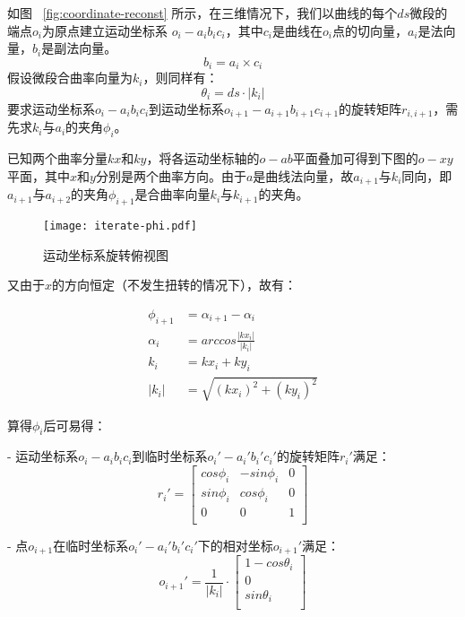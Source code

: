 如图 ~\ref{fig:coordinate-reconst} 所示，在三维情况下，我们以曲线的每个$ds$微段的端点$o_i$为原点建立运动坐标系\cite{three-dimensional-curve} $o_i-a_ib_ic_i$，其中$c_i$是曲线在$o_i$点的切向量，$a_i$是法向量，$b_i$是副法向量。
\begin{equation}
b_i = a_i \times c_i
\end{equation}
假设微段合曲率向量为$k_i$，则同样有：
\begin{equation}
\theta_i = ds\cdot |k_i|
\end{equation}
要求运动坐标系$o_i-a_ib_ic_i$到运动坐标系$o_{i+1}-a_{i+1}b_{i+1}c_{i+1}$的旋转矩阵$r_{i, i+1}$，需先求$k_i$与$a_i$的夹角$\phi_i$。

已知两个曲率分量$kx$和$ky$，将各运动坐标轴的$o-ab$平面叠加可得到下图的$o-xy$平面，其中$x$和$y$分别是两个曲率方向。由于$a$是曲线法向量，故$a_{i+1}$与$k_i$同向，即$a_{i+1}$与$a_{i+2}$的夹角$\phi_{i+1}$是合曲率向量$k_i$与$k_{i+1}$的夹角。

\begin{figure}
\centering
\texttt{[image: iterate-phi.pdf]}
\caption{运动坐标系旋转俯视图}
\label{fig:iterate-phi} 
\end{figure}

又由于$x$的方向恒定（不发生扭转的情况下），故有：

\begin{align}
\phi_{i+1} &= \alpha_{i+1} - \alpha_i \\
\alpha_i &= arccos\frac{|kx_i|}{|k_i|} \\
k_i &= kx_i + ky_i \\
|k_i| &= \sqrt{(kx_i)^2 + (ky_i)^2}
\end{align}

算得$\phi_i$后可易得：

- 运动坐标系$o_i-a_ib_ic_i$到临时坐标系$o_i'-a_i'b_i'c_i'$的旋转矩阵$r_i'$满足：
    \begin{equation}
    r_i' = \left[
            \begin{matrix}
            cos\phi_i & -sin\phi_i & 0\\
            sin\phi_i & cos\phi_i & 0\\
            0 & 0 & 1\\
            \end{matrix}
        \right]
    \end{equation}
    
- 点$o_{i+1}$在临时坐标系$o_i'-a_i'b_i'c_i'$下的相对坐标$o_{i+1}'$满足：
    \begin{equation}
    o_{i+1}' = \frac{1}{|k_i|} \cdot \left[
      \begin{matrix}
    	1 - cos\theta_i\\
    	0 \\
      sin\theta_i\\
      \end{matrix}
    \right]
    \end{equation}
    
